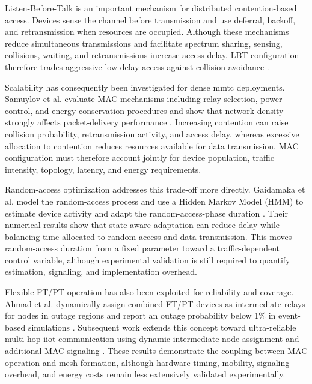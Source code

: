Listen-Before-Talk is an important mechanism for distributed contention-based access. Devices sense the channel before transmission and use deferral, backoff, and retransmission when resources are occupied. Although these mechanisms reduce simultaneous transmissions and facilitate spectrum sharing, sensing, collisions, waiting, and retransmissions increase access delay. LBT configuration therefore trades aggressive low-delay access against collision avoidance \cite{etsi_ts103636_4, samuylovPerformanceMACLayer2024a, glazkovImprovingNearURLLCServices2025}.

Scalability has consequently been investigated for dense \gls{mmtc} deployments. Samuylov et al. evaluate MAC mechanisms including relay selection, power control, and energy-conservation procedures and show that network density strongly affects packet-delivery performance \cite{samuylovPerformanceMACLayer2024a}. Increasing contention can raise collision probability, retransmission activity, and access delay, whereas excessive allocation to contention reduces resources available for data transmission. MAC configuration must therefore account jointly for device population, traffic intensity, topology, latency, and energy requirements.

Random-access optimization addresses this trade-off more directly. Gaidamaka et al. model the random-access process and use a Hidden Markov Model (HMM) to estimate device activity and adapt the random-access-phase duration \cite{gaidamakaOptimizingDelaysRandom2025}. Their numerical results show that state-aware adaptation can reduce delay while balancing time allocated to random access and data transmission. This moves random-access duration from a fixed parameter toward a traffic-dependent control variable, although experimental validation is still required to quantify estimation, signaling, and implementation overhead.

Flexible FT/PT operation has also been exploited for reliability and coverage. Ahmad et al. dynamically assign combined FT/PT devices as intermediate relays for nodes in outage regions and report an outage probability below 1\% in event-based simulations \cite{ahmadMACProtocolReducing2024}. Subsequent work extends this concept toward ultra-reliable multi-hop \gls{iiot} communication using dynamic intermediate-node assignment and additional MAC signaling \cite{ahmadMACLayerProtocolUltraReliable2025}. These results demonstrate the coupling between MAC operation and mesh formation, although hardware timing, mobility, signaling overhead, and energy costs remain less extensively validated experimentally.

